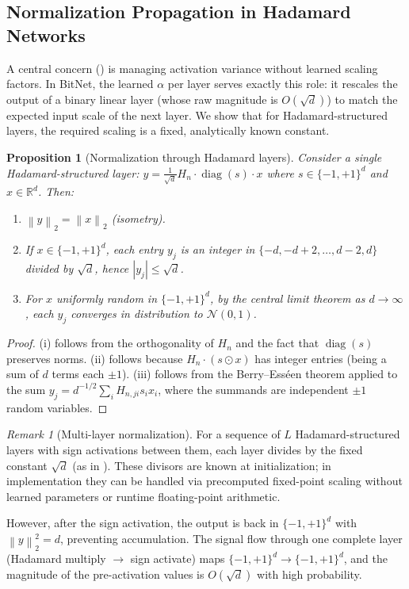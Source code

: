 \documentclass[12pt,a4paper]{article}
\theoremstyle{plain}
\newtheorem{proposition}[theorem]{Proposition}
\theoremstyle{definition}
\theoremstyle{remark}
\newtheorem{remark}[theorem]{Remark}
\newcommand{\R}{\mathbb{R}}
\newcommand{\pmone}{\{-1,+1\}}
\newcommand{\norm}[1]{\left\| #1 \right\|}
\begin{document}
\subsection{Normalization Propagation in Hadamard Networks}\label{sec:norm-propagation}

A central concern () is managing activation variance without learned scaling factors. In BitNet, the learned $\alpha$ per layer serves exactly this role: it rescales the output of a binary linear layer (whose raw magnitude is $O(\sqrt{d})$) to match the expected input scale of the next layer. We show that for Hadamard-structured layers, the required scaling is a fixed, analytically known constant.

\begin{proposition}[Normalization through Hadamard layers]\label{prop:normalization}
Consider a single Hadamard-structured layer: $y = \frac{1}{\sqrt{d}} H_n \cdot \operatorname{diag}(s) \cdot x$ where $s \in \pmone^d$ and $x \in \R^d$. Then:
\begin{enumerate}[label=(\roman*)]
    \item $\norm{y}_2 = \norm{x}_2$ (isometry).
    \item If $x \in \pmone^d$, each entry $y_j$ is an integer in $\{-d, -d+2, \ldots, d-2, d\}$ divided by $\sqrt{d}$, hence $|y_j| \leq \sqrt{d}$.
    \item For $x$ uniformly random in $\pmone^d$, by the central limit theorem as $d \to \infty$, each $y_j$ converges in distribution to $\mathcal{N}(0, 1)$.
\end{enumerate}
\end{proposition}

\begin{proof}
(i) follows from the orthogonality of $H_n$ and the fact that $\operatorname{diag}(s)$ preserves norms. (ii) follows because $H_n \cdot (s \odot x)$ has integer entries (being a sum of $d$ terms each $\pm 1$). (iii) follows from the Berry--Ess\'een theorem applied to the sum $y_j = d^{-1/2} \sum_i H_{n,ji} s_i x_i$, where the summands are independent $\pm 1$ random variables.
\end{proof}

\begin{remark}[Multi-layer normalization]\label{rem:multi-layer}
For a sequence of $L$ Hadamard-structured layers with sign activations between them, each layer divides by the fixed constant $\sqrt{d}$ (as in ). These divisors are known at initialization; in implementation they can be handled via precomputed fixed-point scaling without learned parameters or runtime floating-point arithmetic.

However, after the sign activation, the output is back in $\pmone^d$ with $\norm{y}_2^2 = d$, preventing accumulation. The signal flow through one complete layer (Hadamard multiply $\to$ sign activate) maps $\pmone^d \to \pmone^d$, and the magnitude of the pre-activation values is $O(\sqrt{d})$ with high probability.
\end{remark}
\end{document}
